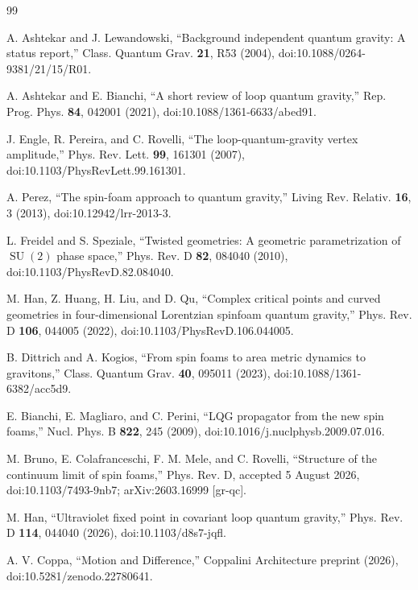 \documentclass[aps,prd,reprint,nofootinbib,superscriptaddress]{revtex4-2}
\newcommand{\SU}{\operatorname{SU}}
\begin{document}
\begin{thebibliography}{99}

A. Ashtekar and J. Lewandowski,
``Background independent quantum gravity: A status report,''
Class. Quantum Grav. \textbf{21}, R53 (2004),
doi:10.1088/0264-9381/21/15/R01.

A. Ashtekar and E. Bianchi,
``A short review of loop quantum gravity,''
Rep. Prog. Phys. \textbf{84}, 042001 (2021),
doi:10.1088/1361-6633/abed91.

J. Engle, R. Pereira, and C. Rovelli,
``The loop-quantum-gravity vertex amplitude,''
Phys. Rev. Lett. \textbf{99}, 161301 (2007),
doi:10.1103/PhysRevLett.99.161301.

A. Perez,
``The spin-foam approach to quantum gravity,''
Living Rev. Relativ. \textbf{16}, 3 (2013),
doi:10.12942/lrr-2013-3.

L. Freidel and S. Speziale,
``Twisted geometries: A geometric parametrization of $\SU(2)$ phase space,''
Phys. Rev. D \textbf{82}, 084040 (2010),
doi:10.1103/PhysRevD.82.084040.

M. Han, Z. Huang, H. Liu, and D. Qu,
``Complex critical points and curved geometries in four-dimensional Lorentzian spinfoam quantum gravity,''
Phys. Rev. D \textbf{106}, 044005 (2022),
doi:10.1103/PhysRevD.106.044005.

B. Dittrich and A. Kogios,
``From spin foams to area metric dynamics to gravitons,''
Class. Quantum Grav. \textbf{40}, 095011 (2023),
doi:10.1088/1361-6382/acc5d9.

E. Bianchi, E. Magliaro, and C. Perini,
``LQG propagator from the new spin foams,''
Nucl. Phys. B \textbf{822}, 245 (2009),
doi:10.1016/j.nuclphysb.2009.07.016.

M. Bruno, E. Colafranceschi, F. M. Mele, and C. Rovelli,
``Structure of the continuum limit of spin foams,''
Phys. Rev. D, accepted 5 August 2026,
doi:10.1103/7493-9nb7; arXiv:2603.16999 [gr-qc].

M. Han,
``Ultraviolet fixed point in covariant loop quantum gravity,''
Phys. Rev. D \textbf{114}, 044040 (2026),
doi:10.1103/d8s7-jqfl.

A. V. Coppa,
``Motion and Difference,''
Coppalini Architecture preprint (2026),
doi:10.5281/zenodo.22780641.

\end{thebibliography}
\end{document}
